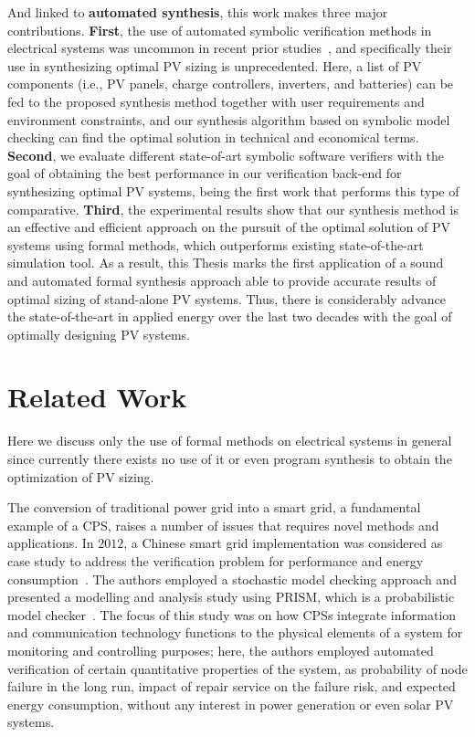 And linked to \textbf{automated synthesis}, this work makes three major contributions. 
\textbf{First}, the use of automated symbolic verification methods in electrical systems was uncommon in recent prior studies~\cite{abs-1811-09438}, and specifically their use in synthesizing optimal PV sizing is unprecedented. Here, a list of PV components (i.e., PV panels, charge controllers, inverters, and batteries) can be fed to the proposed synthesis method together with user requirements and environment constraints, and our synthesis algorithm based on symbolic model checking can find the optimal solution in technical and economical terms. 
\textbf{Second}, we evaluate different state-of-art symbolic software verifiers with the goal of obtaining the best performance in our verification back-end for synthesizing optimal PV systems, being the first work that performs this type of comparative. 
\textbf{Third}, the experimental results show that our synthesis method is an effective and efficient approach on the pursuit of the optimal solution of PV systems using formal methods, which outperforms existing state-of-the-art simulation tool. As a result, this Thesis marks the first application of a sound and automated formal synthesis approach able to provide accurate results of optimal sizing of stand-alone PV systems. Thus, there is considerably advance the state-of-the-art in applied energy over the last two decades with the goal of optimally designing PV systems.
 
\section{Related Work}

Here we discuss only the use of formal methods on electrical systems in general since currently there exists no use of it or even program synthesis to obtain the optimization of PV sizing.

The conversion of traditional power grid into a smart grid, a fundamental example of a CPS, 
raises a number of issues that requires novel methods and applications. In $2012$, a Chinese smart grid implementation was considered as case study to address the verification problem for performance and energy consumption~\cite{Yukseletall2012}. The authors employed a stochastic model checking approach and presented a modelling and analysis study using PRISM, which is a probabilistic model checker~\cite{KwiatkowskaNP11}. The focus of this study was on how CPSs integrate information and communication technology functions to the physical elements of a system for monitoring and controlling purposes; here, the authors employed automated verification of certain quantitative properties of the system, as probability of	 node failure in the long run, impact of repair service on the failure risk, and expected energy consumption, without any interest in power generation or even solar PV systems.

